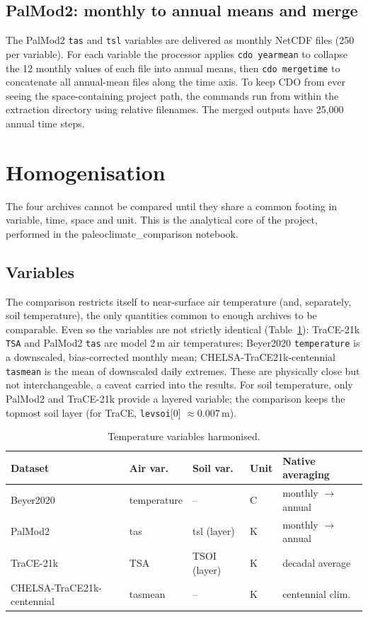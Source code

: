 \documentclass{isprs} %
\newcommand{\degC}{\textdegree C}
\newcommand{\tabbr}[1]{\texttt{#1}}
\begin{document}
\subsection{PalMod2: monthly to annual means and merge}
The PalMod2 \tabbr{tas} and \tabbr{tsl} variables are delivered as monthly NetCDF files (250 per variable). For each variable the processor applies \tabbr{cdo yearmean} to collapse the 12 monthly values of each file into annual means, then \tabbr{cdo mergetime} to concatenate all annual-mean files along the time axis. To keep CDO from ever seeing the space-containing project path, the commands run from within the extraction directory using relative filenames. The merged outputs have 25,000 annual time steps.

\section{Homogenisation}
The four archives cannot be compared until they share a common footing in variable, time, space and unit. This is the analytical core of the project, performed in the paleoclimate\_comparison notebook. \cite{giersch2026_paleoclimate_model_comparison}

\subsection{Variables}
The comparison restricts itself to near-surface air temperature (and, separately, soil temperature), the only quantities common to enough archives to be comparable. Even so the variables are not strictly identical (Table~\ref{tab:vars}): TraCE-21k \tabbr{TSA} and PalMod2 \tabbr{tas} are model 2\,m air temperatures; Beyer2020 \tabbr{temperature} is a downscaled, bias-corrected monthly mean; CHELSA-TraCE21k-centennial \tabbr{tasmean} is the mean of downscaled daily extremes. These are physically close but not interchangeable, a caveat carried into the results. For soil temperature, only PalMod2 and TraCE-21k provide a layered variable; the comparison keeps the topmost soil layer (for TraCE, \tabbr{levsoi}[0] $\approx 0.007$\,m).

\begin{table}[t]
\centering
\small
\begin{tabular}{lllll}
\toprule
Dataset   & Air var.    & Soil var.    & Unit  & Native averaging \\
\midrule
Beyer2020 & temperature & --           & \degC & monthly $\rightarrow$ annual \\
PalMod2   & tas         & tsl (layer)  & K     & monthly $\rightarrow$ annual \\
TraCE-21k & TSA         & TSOI (layer) & K     & decadal average \\
CHELSA-TraCE21k-centennial    & tasmean     & --           & K     & centennial clim. \\
\bottomrule
\end{tabular}
\caption{Temperature variables harmonised.}
\label{tab:vars}
\end{table}
\end{document}
